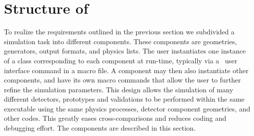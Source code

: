 \documentclass[article]{IEEEtran}
\begin{document}

\section{Structure of \MaGe\ }
\label{section:structure} 


To realize the requirements outlined in the previous section we subdivided a simulation task into different  components. These components are geometries, generators, output formats, and physics lists. The user instantiates one instance of a class corresponding to each component at run-time, typically via a \GF\ user interface command in a macro file. A component may then also instantiate other components, and have its own macro commands that allow the user to further refine the simulation parameters. This design allows the simulation of many different detectors, prototypes and
validations to be performed within the same executable using
the same physics processes, detector component geometries, and other codes. This greatly eases cross-comparisons and reduces coding and debugging effort. The components are described in this section. 
\end{document}

